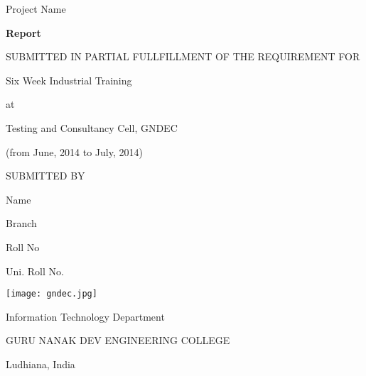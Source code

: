 \documentclass[12pt,a4paper]{article}
\begin{document}
\thispagestyle{empty}
\begin{center}  
{\fontsize{24}{30}\selectfont Project Name}
\vspace*{3\baselineskip}

{\bfseries\fontsize{16}{30}\selectfont Report}

\vspace*{1\baselineskip}

SUBMITTED IN PARTIAL FULLFILLMENT OF THE REQUIREMENT FOR    

Six Week Industrial Training

\vspace*{2\baselineskip}

at

\vspace*{2\baselineskip}

{\bfseries\fontsize{14}{20}\selectfont 

Testing and Consultancy Cell, GNDEC

     
(from June, 2014 to July, 2014)

}

\vspace*{3\baselineskip}    

SUBMITTED BY

\vspace*{\baselineskip}

{\fontsize{14}{15}\selectfont

Name

Branch

Roll No

Uni. Roll No.
}

\vspace*{3\baselineskip}
\texttt{[image: gndec.jpg]}
\vspace*{4\baselineskip}
\begin{flushbottom}
{\bfseries\fontsize{14}{20}\selectfont 

Information Technology Department

GURU NANAK DEV ENGINEERING COLLEGE}

{\fontsize{14}{15}\selectfont Ludhiana, India}


\end{flushbottom}
\end{center}
\end{document}
